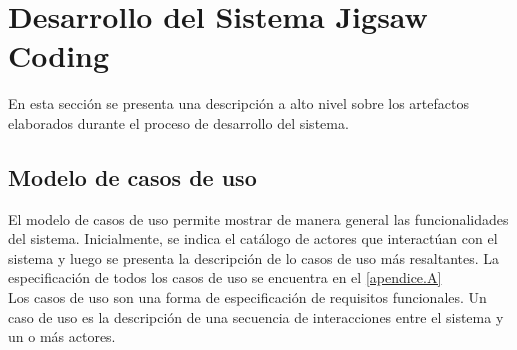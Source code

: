 %
\clearpage
\section{Desarrollo del Sistema Jigsaw Coding}
En esta sección se presenta una descripción a alto nivel sobre los artefactos elaborados durante el proceso de desarrollo del sistema.

\subsection{Modelo de casos de uso}
El modelo de casos de uso permite mostrar de manera general las funcionalidades del sistema. Inicialmente, se indica el catálogo de actores que interactúan con el sistema y luego se presenta la descripción de lo casos de uso más resaltantes. La especificación de todos los casos de uso se encuentra en el \autoref{apendice.A}\\

Los casos de uso son una forma de especificación de requisitos funcionales. Un caso de uso es la descripción de una secuencia de interacciones entre el sistema y un o más actores.

